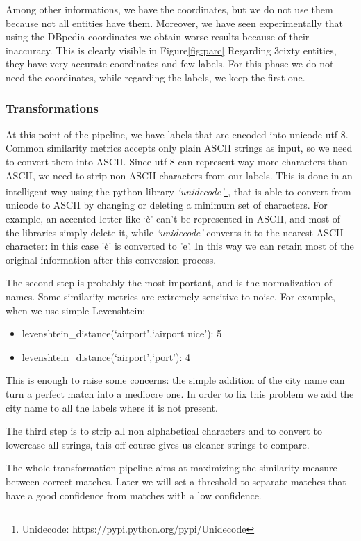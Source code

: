\documentclass[paper=a4, fontsize=11pt]{scrartcl}
\begin{document}
Among other informations, we have the coordinates, but we do not use them because not all entities have them. Moreover, we have seen experimentally that using the DBpedia coordinates we obtain worse results because of their inaccuracy. This is clearly visible in Figure\ref{fig:parc}
Regarding 3cixty entities, they have very accurate coordinates and few labels. For this phase we do not need the coordinates, while regarding the labels, we keep the first one.

\subsubsection{Transformations}
At this point of the pipeline, we have labels that are encoded into unicode utf-8. Common similarity metrics accepts only plain ASCII strings as input, so we need to convert them into ASCII. Since utf-8 can represent way more characters than ASCII, we need to strip non ASCII characters from our labels. This is done in an intelligent way using the python library \textit{`unidecode'}\footnote{Unidecode: https://pypi.python.org/pypi/Unidecode}, that is able to convert from unicode to ASCII by changing or deleting a minimum set of characters. For example, an accented letter like `è' can't be represented in ASCII, and most of the libraries simply delete it, while \textit{`unidecode'} converts it to the nearest ASCII character: in this case 'è' is converted to 'e'. In this way we can retain most of the original information after this conversion process.

The second step is probably the most important, and is the normalization of names. Some similarity metrics are extremely sensitive to noise. For example, when we use simple Levenshtein:
\begin{itemize}
\item levenshtein\_distance(`airport',`airport nice'): 5
\item levenshtein\_distance(`airport',`port'): 4
\end{itemize}
This is enough to raise some concerns: the simple addition of the city name can turn a perfect match into a mediocre one. In order to fix this problem we add the city name to all the labels where it is not present.

The third step is to strip all non alphabetical characters and to convert to lowercase all strings, this off course gives us cleaner strings to compare.

The whole transformation pipeline aims at maximizing the similarity measure between correct matches. Later we will set a threshold to separate matches that have a good confidence from matches with a low confidence.
\end{document}
